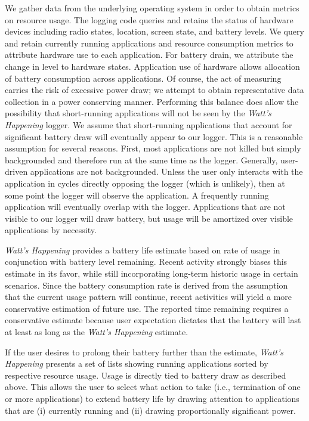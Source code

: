 We gather data from the underlying operating system in order to obtain metrics on resource usage.
The logging code queries and retains the status of hardware devices including radio states, location, screen state, and battery levels.
We query and retain currently running applications and resource consumption metrics to attribute hardware use to each application.
For battery drain, we attribute the change in level to hardware states.
Application use of hardware allows allocation of battery consumption across applications.
Of course, the act of measuring carries the risk of excessive power draw; we attempt to obtain representative data collection in a power conserving manner.
Performing this balance does allow the possibility that short-running applications will not be seen by the \emph{Watt's Happening} logger.
We assume that short-running applications that account for significant battery draw will eventually appear to our logger.
This is a reasonable assumption for several reasons.
First, most applications are not killed but simply backgrounded and therefore run at the same time as the logger.
Generally, user-driven applications are not backgrounded.
Unless the user only interacts with the application in cycles directly opposing the logger (which is unlikely), then at some point the logger will observe the application.
A frequently running application will eventually overlap with the logger.
Applications that are not visible to our logger will draw battery, but usage will be amortized over visible applications by necessity.


\emph{Watt's Happening} provides a battery life estimate based on rate of usage in conjunction with battery level remaining.
Recent activity strongly biases this estimate in its favor, while still incorporating long-term historic usage in certain scenarios.
Since the battery consumption rate is derived from the assumption that the current usage pattern will continue, recent activities will yield a more conservative estimation of future use.
The reported time remaining requires a conservative estimate because user expectation dictates that the battery will last at least as long as the \emph{Watt's Happening} estimate.


If the user desires to prolong their battery further than the estimate, \emph{Watt's Happening} presents a set of lists showing running applications sorted by respective resource usage.
Usage is directly tied to battery draw as described above. 
This allows the user to select what action to take (i.e., termination of one or more applications) to extend battery life by drawing attention to applications that are (i) currently running and (ii) drawing proportionally significant power.


